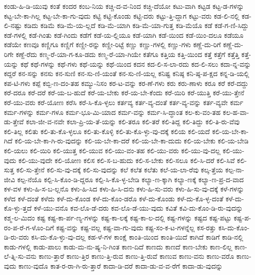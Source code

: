 {ಕಂಡು-ಹಿ-ಡಿ-ಯುವು
ಕಂತೆ
ಕಂದರ
ಕಂಬ-ನಿಯ
ಕಚ್ಚಿ-ದ-ವ-ನಿಂದ
ಕಚ್ಚಿ-ದೆಯೋ
ಕಟು-ವಾಗಿ
ಕಟ್ಟಡ
ಕಟ್ಟ-ಡ-ಗಳನ್ನು
ಕಟ್ಟ-ಬೇ-ಕಾ-ಗಿಲ್ಲ
ಕಟ್ಟ-ಬೇ-ಕಾ-ಗು-ವುದು
ಕಟ್ಟಿ
ಕಟ್ಟಿ-ಕೊಂಡು
ಕಟ್ಟಿ-ದರು
ಕಟ್ಟು-ತ್ತಿ-ದ್ದಾಗ
ಕಟ್ಟು-ವರು
ಕಡ-ಲಿ-ನಲ್ಲಿ
ಕಡ-ಲಿ-ನಷ್ಟು
ಕಡಿದು
ಕಡಿಮೆ
ಕಡಿ-ಮೆ-ಯ-ಲ್ಲದೆ
ಕಡಿ-ಮೆ-ಯಾಗಿ
ಕಡಿ-ಮೆ-ಯಾ-ಗುತ್ತ
ಕಡಿ-ಮೆಯೊ
ಕಡೆ
ಕಡೆ-ಗ-ಣಿ-ಸಿದ್ದು
ಕಡೆ-ಗಳಲ್ಲಿ
ಕಡೆ-ಗಿಂತು
ಕಡೆ-ಗಿಂದು
ಕಡೆಗೆ
ಕಡೆ-ಯ-ಲ್ಲಿಯೂ
ಕಡೆ-ಯಾಗಿ
ಕಡೆ-ಯಿಂದ
ಕಡೆ-ಯಿಂ-ದಲೂ
ಕಡೆಯೂ
ಕಡೆಯೇ
ಕಣವೂ
ಕಣ್ಣಿಗೂ
ಕಣ್ಣಿಗೆ
ಕಣ್ಣೀ-ರನ್ನು
ಕಣ್ಣೀ-ರಿಟ್ಟೆ
ಕಣ್ಣು
ಕಣ್ಣು-ಗಳಲ್ಲಿ
ಕಣ್ಣು-ಗಳು
ಕಣ್ಣೆ-ದು-ರಿಗೆ
ಕಣ್ಣೆ-ದು-ರಿಗೇ
ಕಣ್ದೆ-ರೆದು
ಕಣ್ಮ-ರೆ-ಯಾ-ಗ-ಕೂ-ಡದು
ಕಣ್ಮ-ರೆ-ಯಾ-ಗಿಯೇ
ಕತೆಗೂ
ಕತ್ತಿಯ
ಕತ್ತಿ-ಯಿಂದ
ಕತ್ತೆ
ಕತ್ತೆಗೆ
ಕತ್ತೆತ್ತಿ
ಕತ್ತೆ-ಯನ್ನು
ಕಥೆ
ಕಥೆ-ಗಳನ್ನು
ಕಥೆ-ಗಳು
ಕಥೆ-ಯನ್ನು
ಕಥೆ-ಯಿಂದ
ಕದನ
ಕದ-ಲಿ-ಸ-ಲಾ-ರದು
ಕದ-ಲಿ-ಸಲು
ಕದಾ-ನ್ನ-ವನ್ನು
ಕದ್ದರೆ
ಕನ-ಸನ್ನು
ಕನಸು
ಕನ-ಸುಣಿ
ಕನ-ಸು-ಣಿ-ಯಂತೆ
ಕನ-ಸು-ಣಿ-ಯಲ್ಲ
ಕನಿಷ್ಟ
ಕನಿಷ್ಠ
ಕನಿ-ಷ್ಠ-ಪ-ಕ್ಷದ
ಕನ್ನ-ಡಿ-ಯಲ್ಲಿ
ಕಪ-ಟಿ-ಗಳು
ಕಪ್ಪೆ
ಕಬ್ಬಿ-ಣ-ದಂ-ತಹ
ಕಮ್ಯು-ನಿಸಂ
ಕರ-ಟ-ವನ್ನು
ಕರ-ಣೆ-ಗಳು
ಕರು
ಕರು-ಣಾಳು
ಕರೂ
ಕರೆ
ಕರೆ-ದದ್ದು
ಕರೆ-ದರೂ
ಕರೆ-ದರೆ
ಕರೆ-ಯ-ಬ-ಹುದೆ
ಕರೆ-ಯ-ಬೇಕು
ಕರೆ-ಯ-ಬೇ-ಕೆಂದು
ಕರೆ-ಯಿರಿ
ಕರೆ-ಯುತ್ತಿ
ಕರೆ-ಯು-ತ್ತೇನೆ
ಕರೆ-ಯು-ವರು
ಕರೆ-ಯೋಣ
ಕರೆಸಿ
ಕರೆ-ಸಿ-ಕೊ-ಳ್ಳಲು
ಕರ್ತವ್ಯ
ಕರ್ತ-ವ್ಯ-ದಂತೆ
ಕರ್ತ-ವ್ಯ-ವನ್ನು
ಕರ್ತ-ವ್ಯವೇ
ಕರ್ಮ
ಕರ್ಮ-ಗಳನ್ನು
ಕರ್ಮ-ಗಳೂ
ಕರ್ಮ-ಭೂ-ಮಿ-ಯಾದ
ಕರ್ಮ-ವನ್ನು
ಕರ್ಮ-ಸಿ-ದ್ಧಾಂತ
ಕಲ-ಕು-ವಂ-ತಹ
ಕಲ-ಹ-ವಾ-ಡು-ತ್ತೇವೆ
ಕಲಾ-ಜೀ-ವ-ನವೇ
ಕಲಾ-ಪ್ರಿ-ಯ-ತೆ-ಯನ್ನು
ಕಲಿ-ತರೂ
ಕಲಿ-ತರೆ
ಕಲಿ-ತಿದ್ದ
ಕಲಿ-ತಿದ್ದು
ಕಲಿ-ತಿ-ರು-ವೆವು
ಕಲಿ-ತಿಲ್ಲ
ಕಲಿತು
ಕಲಿ-ತು-ಕೊ-ಳ್ಳಲೂ
ಕಲಿ-ತು-ಕೊಳ್ಳಿ
ಕಲಿ-ತು-ಕೊ-ಳ್ಳು-ವು-ದಕ್ಕೆ
ಕಲಿಯ
ಕಲಿ-ಯದೆ
ಕಲಿ-ಯ-ಬೇ-ಕಾ-ಗಿದೆ
ಕಲಿ-ಯ-ಬೇ-ಕಾ-ಗಿ-ರು-ವುದನ್ನು
ಕಲಿ-ಯ-ಬೇ-ಕಾ-ದರೆ
ಕಲಿ-ಯ-ಬೇ-ಕಾ-ದುದು
ಕಲಿ-ಯ-ಬೇಕು
ಕಲಿ-ಯ-ಬೇಡಿ
ಕಲಿ-ಯಲು
ಕಲಿ-ಯಿರಿ
ಕಲಿ-ಯುತ್ತ
ಕಲಿ-ಯುವ
ಕಲಿ-ಯು-ವಂ-ತಹ
ಕಲಿ-ಯು-ವರು
ಕಲಿ-ಯು-ವು-ದಲ್ಲ
ಕಲಿ-ಯು-ವುದು
ಕಲಿ-ಯು-ವುದೇ
ಕಲಿ-ಯೋಣ
ಕಲಿಸ
ಕಲಿ-ಸ-ಬ-ಹುದು
ಕಲಿ-ಸ-ಬೇಕು
ಕಲಿ-ಸಲೂ
ಕಲಿ-ಸಿ-ದರೆ
ಕಲಿ-ಸಿವೆ
ಕಲಿ-ಸುತ್ತ
ಕಲಿ-ಸು-ತ್ತೇನೆ
ಕಲಿ-ಸು-ವು-ದಕ್ಕೆ
ಕಲಿ-ಸು-ವುದನ್ನು
ಕಲೆ
ಕಲೆತ
ಕಲೆತು
ಕಲೆ-ಯ-ಲಾ-ರೆವು
ಕಲ್ಕ-ತ್ತೆಯ
ಕಲ್ಪ-ನಾ-ಜೀವಿ
ಕಲ್ಪ-ನೆಯೊ
ಕಲ್ಪಿ-ಸಿ-ಕೊಂ-ಡಿ-ದ್ದರೂ
ಕಲ್ಪಿ-ಸಿ-ಕೊ-ಳ್ಳ-ಬೇಡಿ
ಕಲ್ಯಾ-ಣ-ಕ್ಕಾಗಿ
ಕಲ್ಯಾ-ಣಕ್ಕೆ
ಕಲ್ಯಾ-ಣ-ಪ್ರ-ದ-ವಾದ
ಕಳ-ವಳ
ಕಳು-ಹಿ-ಸ-ಬ-ಲ್ಲನೊ
ಕಳು-ಹಿ-ಸಿದ
ಕಳು-ಹಿ-ಸಿ-ದನು
ಕಳು-ಹಿ-ಸು-ವರು
ಕಳು-ಹಿ-ಸು-ವು-ದಕ್ಕೆ
ಕಳೆ-ಗಳನ್ನು
ಕಳೆದ
ಕಳೆ-ದಂತೆ
ಕಳೆದು
ಕಳೆ-ದು-ಕೊಂಡ
ಕಳೆ-ದು-ಕೊಂ-ಡರೊ
ಕಳೆ-ದು-ಕೊಂಡು
ಕಳೆ-ದು-ಕೊ-ಳ್ಳ-ದಂತೆ
ಕಳೆ-ದು-ಕೊ-ಳ್ಳು-ತ್ತದೆ
ಕಳೆ-ಯು-ವನೊ
ಕವ-ಲೊ-ಡೆ-ದರು
ಕವ-ಲೊ-ಡೆ-ಯು-ವುದು
ಕವಿತೆ
ಕವಿ-ದು-ಕೊಂ-ಡಿ-ರು-ವುದನ್ನು
ಕಶ್ಮ-ಲ-ಮಿದಂ
ಕಷ್ಟ
ಕಷ್ಟ-ಕಾ-ರ್ಪ-ಣ್ಯ-ಗಳನ್ನು
ಕಷ್ಟ-ಕಾ-ಲಕ್ಕೆ
ಕಷ್ಟ-ಕಾ-ಲ-ದಲ್ಲಿ
ಕಷ್ಟ-ಗಳನ್ನು
ಕಷ್ಟದ
ಕಷ್ಟ-ಪಟ್ಟು
ಕಷ್ಟ-ಪ-ರಂ-ಪ-ರೆ-ಗ-ಳೊಂ-ದಿಗೆ
ಕಷ್ಟ-ವನ್ನು
ಕಷ್ಟ-ವಲ್ಲ
ಕಷ್ಟ-ವಾ-ಗು-ವುದು
ಕಷ್ಟ-ಸಂ-ಕ-ಟ-ಗಳನ್ನೆಲ್ಲ
ಕಸ-ರತ್ತು
ಕಸಿ-ದು-ಕೊಂ-ಡಿ-ರು-ವರು
ಕಸಿ-ದು-ಕೊ-ಳ್ಳು-ವು-ದಲ್ಲ
ಕಹ-ಳೆ-ಗಳ
ಕಾಂಕ್ಷೆ
ಕಾಂತಿ-ಯಿಂದ
ಕಾಂತಿ-ಯಿದೆ
ಕಾಗಿದೆ
ಕಾಡಿಗೆ
ಕಾಡಿ-ನಲ್ಲಿ
ಕಾಡು-ಗಳಲ್ಲಿ
ಕಾಡು-ಪಾಲು
ಕಾಡು-ಮ-ನು-ಷ್ಯ-ನಿ-ಗಿಂತ
ಕಾಣ-ದಿದೆ
ಕಾಣದು
ಕಾಣದೆ
ಕಾಣ-ಬೇಕು
ಕಾಣ-ಲಿಲ್ಲ
ಕಾಣ-ಲೆ-ತ್ನಿ-ಸು-ವನು
ಕಾಣು-ತ್ತಾರೆ
ಕಾಣು-ತ್ತಿರ
ಕಾಣು-ತ್ತಿ-ರುವ
ಕಾಣು-ತ್ತಿ-ರುವೆ
ಕಾಣುವ
ಕಾಣು-ವನು
ಕಾಣು-ವರೊ
ಕಾಣು-ವುದು
ಕಾಣು-ವುದೊ
ಕಾತ-ರ-ರಾ-ಗಿ-ರು-ತ್ತಾರೆ
ಕಾದಾ-ಡಿ-ದರೆ
ಕಾದಾ-ಡು-ವ-ವ-ರೆಗೆ
ಕಾದಾ-ಡು-ವುದನ್ನು
}
